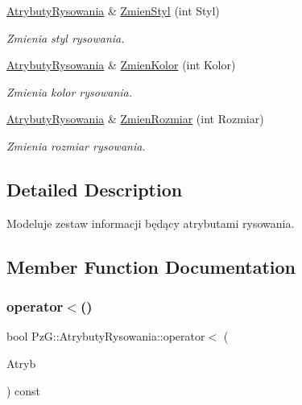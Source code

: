 \begin{DoxyCompactItemize}
\mbox{\hyperlink{class_pz_g_1_1_atrybuty_rysowania}{Atrybuty\+Rysowania}} \& \mbox{\hyperlink{class_pz_g_1_1_atrybuty_rysowania_a2ac97706124b14072715ecf3f07e82b4}{Zmien\+Styl}} (int Styl)
\begin{DoxyCompactList}\small\item\em Zmienia styl rysowania. \end{DoxyCompactList}\item 
\mbox{\hyperlink{class_pz_g_1_1_atrybuty_rysowania}{Atrybuty\+Rysowania}} \& \mbox{\hyperlink{class_pz_g_1_1_atrybuty_rysowania_ab068535b4d2f755c394557d1da72a4eb}{Zmien\+Kolor}} (int Kolor)
\begin{DoxyCompactList}\small\item\em Zmienia kolor rysowania. \end{DoxyCompactList}\item 
\mbox{\hyperlink{class_pz_g_1_1_atrybuty_rysowania}{Atrybuty\+Rysowania}} \& \mbox{\hyperlink{class_pz_g_1_1_atrybuty_rysowania_af4b140eb03bc10b6fd816fad63f8372e}{Zmien\+Rozmiar}} (int Rozmiar)
\begin{DoxyCompactList}\small\item\em Zmienia rozmiar rysowania. \end{DoxyCompactList}\end{DoxyCompactItemize}


\subsection{Detailed Description}
Modeluje zestaw informacji będący atrybutami rysowania. 



\subsection{Member Function Documentation}
\mbox{\label{class_pz_g_1_1_atrybuty_rysowania_aeae8811cf8c6eef100fdae0322b8f650}} 
\subsubsection{\texorpdfstring{operator$<$()}{operator<()}}
{\footnotesize\ttfamily bool Pz\+G\+::\+Atrybuty\+Rysowania\+::operator$<$ (\begin{DoxyParamCaption}\item[{const \mbox{\hyperlink{class_pz_g_1_1_atrybuty_rysowania}{Atrybuty\+Rysowania}} \&}]{Atryb }\end{DoxyParamCaption}) const\hspace{0.3cm}{\ttfamily [inline]}}



